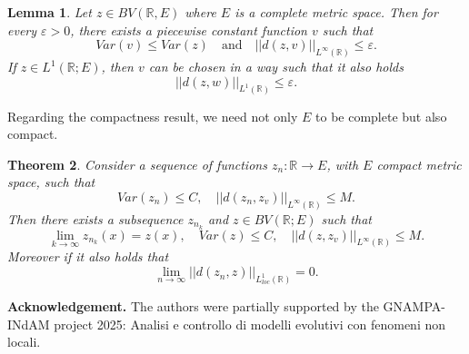 \documentclass[12pt]{article}
\newcommand{\R}{\mathbb{R}}
\newcommand{\1}{\mathds{1}}
\newtheorem{teo}{Theorem}[section]
\newtheorem{lem}[teo]{Lemma}
\theoremstyle{definition}
\begin{document}
\begin{lem}\label{lemma: BV2}
    Let $z\in BV(\R,E)$ where $E$ is a complete metric space. Then for every $\varepsilon>0$, there exists a piecewise constant function $v$ such that \begin{equation}
        Var(v)\leq Var(z) \quad \text{and} \quad ||d(z,v)||_{L^\infty(\R)}\leq \varepsilon.
    \end{equation}
    If $z\in L^1(\R;E)$, then $v$ can be chosen in a way such that it also holds
    \begin{equation}
        ||d(z,w)||_{L^1(\R)}\leq \varepsilon.
    \end{equation}
\end{lem}
Regarding the compactness result, we need not only $E$ to be complete but also compact. 
\begin{teo}\label{teo: BV3}
    Consider a sequence of functions $z_n: \R \to E$, with $E$ compact metric space, such that \begin{equation}
        Var(z_n)\leq C, \quad ||d(z_n,z_v)||_{L^\infty(\R)}\leq M. 
    \end{equation}
    Then there exists a subsequence $z_{n_k}$ and $z\in BV(\R; E)$ such that \begin{equation} \label{eq: teohelly1}
        \lim_{k\to \infty} z_{n_k}(x)=z(x), \quad Var(z)\leq C, \quad ||d(z,z_v)||_{L^\infty(\R)} \leq M.
    \end{equation}
    Moreover if it also holds that \begin{equation}
    \lim_{n\to\infty}||d(z_n,z)||_{L^1_{loc}(\R)} =0.
    \end{equation}
\end{teo}

\bigskip

{\bf Acknowledgement.} The authors were partially supported by the GNAMPA-INdAM project 2025: Analisi e controllo di modelli evolutivi con fenomeni non locali.



\printbibliography
\end{document}
